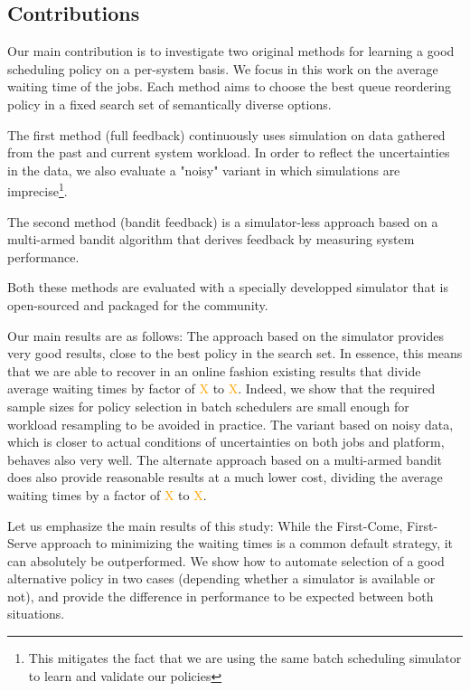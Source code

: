 \documentclass[sigconf,review]{acmart}
\begin{document}
\subsection{Contributions}

Our main contribution is to investigate two original methods for learning a
good scheduling policy on a per-system basis. We focus in this work on the
average waiting time of the jobs. Each method aims to choose the best queue
reordering policy in a fixed search set of semantically diverse options.

The first method (full feedback) continuously uses simulation on data gathered
from the past and current system workload. In order to reflect the
uncertainties in the data, we also evaluate a "noisy" variant in which
simulations are imprecise\footnote{This mitigates the fact that we are
using the same batch scheduling simulator to learn and validate our policies}.

The second method (bandit feedback) is a simulator-less approach based on a
multi-armed bandit algorithm that derives feedback by measuring system
performance.

Both these methods are evaluated with a specially developped simulator that is
open-sourced and packaged for the community.

\bigskip

Our main results are as follows: The approach based on the simulator provides
very good results, close to the best policy in the search set. In essence, this
means that we are able to recover in an online fashion existing results that
divide average waiting times by factor of \textcolor{orange}{X} to
\textcolor{orange}{X}. Indeed, we show that the required sample sizes for
policy selection in batch schedulers are small enough for workload resampling to
be avoided in practice. The variant based on noisy data, which is closer to
actual conditions of uncertainties on both jobs and platform, behaves also very
well. The alternate approach based on a multi-armed bandit does also provide
reasonable results at a much lower cost, dividing the average waiting times by
a factor of \textcolor{orange}{X} to \textcolor{orange}{X}.

Let us emphasize the main results of this study: While the First-Come,
First-Serve approach to minimizing the waiting times is a common default
strategy, it can absolutely be outperformed.  We show how to automate selection
of a good alternative policy in two cases (depending whether a simulator is
available or not), and provide the difference in performance to be expected
between both situations.
\end{document}
